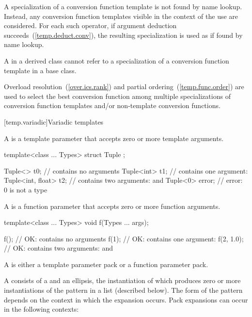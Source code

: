\pnum
A specialization of a
conversion function template
is not found by name
lookup.
Instead, any
conversion function templates
visible in the
context of the use are considered.
For each such operator, if argument
deduction succeeds~(\ref{temp.deduct.conv}), the resulting specialization is
used as if found by name lookup.

\pnum
A  in a derived class cannot refer to a specialization
of a
conversion function template
in a base class.

\pnum
Overload resolution~(\ref{over.ics.rank}) and partial
ordering~(\ref{temp.func.order}) are used to select the best conversion function
among multiple
specializations of conversion function templates
and/or non-template
conversion functions.

[temp.variadic]{Variadic templates}

\pnum
A  is a template parameter
that accepts zero or more template arguments. \enterexample

\begin{codeblock}
template<class ... Types> struct Tuple { };

Tuple<> t0;                     //  contains no arguments
Tuple<int> t1;                  //  contains one argument: 
Tuple<int, float> t2;           //  contains two arguments:  and 
Tuple<0> error;                 // error: 0 is not a type
\end{codeblock}

\exitexample

\pnum
A  is a function parameter
that accepts zero or more function arguments. \enterexample

\begin{codeblock}
template<class ... Types> void f(Types ... args);

f();                // OK:  contains no arguments
f(1);               // OK:  contains one argument: 
f(2, 1.0);          // OK:  contains two arguments:  and 
\end{codeblock}

\exitexample

\pnum
A  is either a template parameter
pack or a function parameter pack.

\pnum
A 
consists of a  and an ellipsis, the instantiation of which
produces zero or more instantiations of the pattern in a list (described below).
The form of the pattern
depends on the context in which the expansion occurs. Pack
expansions can occur in the following contexts:

